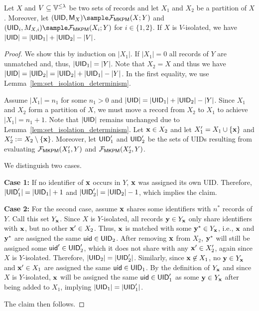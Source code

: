 \begin{lemma}
  \label{lem:set_isolation_inference}
  Let $X$ and $V\subseteq \Ispace{}^{\leq \lambda}$ be two sets of records and
  let $X_1$ and $X_2$ be a partition of $X$.  Moreover, let
  $(\UID, \MX) \sample \calF_{\MKPM}(X; Y)$ and
  $(\UID_i, M_{X,i}) \sample \calF_{\MKPM}(X_i; Y)$ for $i \in \{1,2\}$.  If $X$
  is $V$-isolated, we have $|\mathsf{UID}| = |\mathsf{UID}_1| + |\mathsf{UID}_2| - |V|$.
\end{lemma}

\begin{proof}
We show this by induction on $|X_1|$.
If $|X_1| = 0$ all records of $Y$ are unmatched and, thus, $|\mathsf{UID}_1| = |Y|$.
Note that $X_2 = X$ and thus we have $|\mathsf{UID}| = |\mathsf{UID}_2| = |\mathsf{UID}_2| + |\mathsf{UID}_1| - |Y|$.
In the first equality, we use Lemma~\ref{lem:set_isolation_determinism}. 

Assume $|X_1| = n_1$ for some $n_1 > 0$ and $|\mathsf{UID}| = |\mathsf{UID}_1| + |\mathsf{UID}_2| - |Y|$.
Since $X_1$ and $X_2$ form a partition of $X$, we must move a record from $X_2$ to $X_1$ to achieve $|X_1| = n_1+1$. Note that $|\mathsf{UID}|$ remains unchanged due to Lemma~\ref{lem:set_isolation_determinism}.
Let $\mathbf{x} \in X_2$ and let $X'_1 = X_1 \cup \{\mathbf{x}\}$ and $X'_2 := X_2 \setminus \{\mathbf{x}\}$.
Moreover, let $\mathsf{UID}'_1$ and $\mathsf{UID}'_2$ be the sets of UIDs resulting from evaluating $\mathcal{F}_{\mathsf{MKPM}}(X'_1, Y)$ and $\mathcal{F}_{\mathsf{MKPM}}(X'_2, Y)$. 

We distinguish two cases.

\textbf{Case 1:} If no identifier of $\mathbf{x}$ occurs in $Y$, $\mathbf{x}$ was assigned its own UID.
Therefore, $|\mathsf{UID}'_1| = |\mathsf{UID}_1| + 1$ and $|\mathsf{UID}'_2| = |\mathsf{UID}_2| - 1$, which implies the claim.
	
\textbf{Case 2:} For the second case, assume $\mathbf{x}$ shares some identifiers with $n^*$ records of $Y$. Call this set $Y_{\mathbf{x}}$.
Since $X$ is $Y$-isolated, all records $\mathbf{y} \in Y_{\mathbf{x}}$ only share identifiers with $\mathbf{x}$,	but no other $\mathbf{x}'\in X_2$.
Thus, $\mathbf{x}$ is matched with some $\mathbf{y}^* \in Y_{\mathbf{x}}$,
i.e., $\mathbf{x}$ and $\mathbf{y}^*$ are assigned the same $\mathsf{uid} \in \mathsf{UID}_2$. After removing $\mathbf{x}$ from $X_2$, $\mathbf{y}^*$ will still be assigned some $\mathsf{uid}' \in \mathsf{UID}'_2$, which it does not share with any $\mathbf{x}' \in X'_2$, again since $X$ is $Y$-isolated. 
Therefore, $|\mathsf{UID}_2| = |\mathsf{UID}'_2|$. 
Similarly, since $\mathbf{x}\not\in X_1$, no $\mathbf{y}\in Y_{\mathbf{x}}$ and $\mathbf{x}' \in X_1$ are assigned the same $\mathsf{uid} \in \mathsf{UID}_1$.
By the definition of $Y_{\mathbf{x}}$ and since $X$ is $Y$-isolated, $\mathbf{x}$ will be assigned the same $\mathsf{uid}\in \mathsf{UID}'_1$
as some $\mathbf{y}\in Y_{\mathbf{x}}$ after being added to $X_1$, implying $|\mathsf{UID}_1| = |\mathsf{UID}'_1|$.

The claim then follows.
\end{proof}


